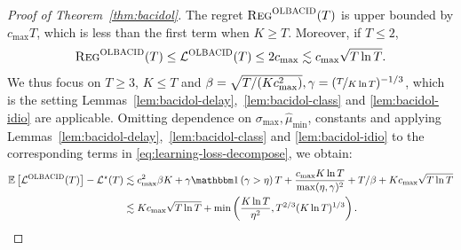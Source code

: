 \begin{proof}[Proof of Theorem~\ref{thm:bacidol}]
The regret $\textsc{Reg}^{\textsc{OLBACID}}(T)$ is upper bounded by $c_{\max}T$, which is less than the first term when $K \geq T$. Moreover, if $T \leq 2$, \[\textsc{Reg}^{\textsc{OLBACID}}(T) \leq \mathcal{L}^{\textsc{OLBACID}}(T) \leq 2c_{\max} \lesssim c_{\max}\sqrt{T\ln T}.\] We thus focus on $T \geq 3$, $K \leq T$ and $
\beta = \sqrt{T / (Kc^2_{\max})}, \gamma = (\nicefrac{T}{K\ln T})^{-1/3}$, which is the setting Lemmas~\ref{lem:bacidol-delay},~\ref{lem:bacidol-class} and \ref{lem:bacidol-idio} are applicable.
Omitting dependence on $\sigma_{\max}, \hat{\mu}_{\min}$, constants and applying Lemmas~\ref{lem:bacidol-delay},~\ref{lem:bacidol-class} and \ref{lem:bacidol-idio} to the corresponding terms in \eqref{eq:learning-loss-decompose}, we obtain:
\begin{equation}\label{eq:bound-olbacid}
\begin{aligned}
\expect{\loss^{\bacidol}(T)} - \loss^\star(T) &\lesssim c^2_{\max}\beta K + \gamma\indic{\gamma > \eta} T + \frac{c_{\max}K\ln T}{\max(\eta,\gamma)^2} + T / \beta + Kc_{\max}\sqrt{T\ln T}\\
&\lesssim Kc_{\max}\sqrt{T\ln T} + \min\left(\frac{K\ln T}{\eta^2}, T^{2/3}(K\ln T)^{1/3}\right).
\end{aligned}
\end{equation}
\end{proof}

